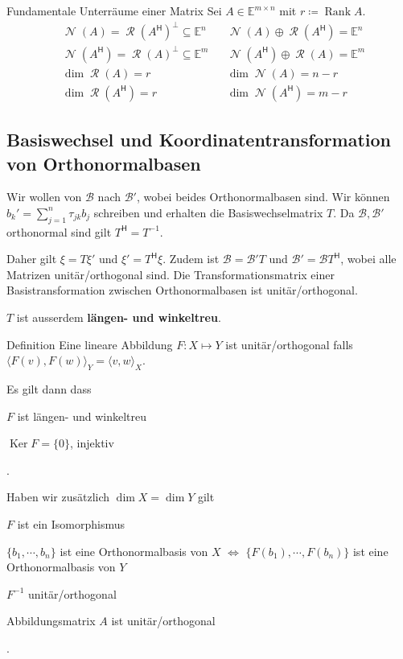 \documentclass[a4paper,10pt]{article}
\DeclareMathOperator{\Rank}{Rank}
\DeclareMathOperator{\Columnspace}{\mathcal{R}}
\DeclareMathOperator{\Nullspace}{\mathcal{N}}
\DeclareMathOperator{\Kernel}{Ker}
\newcommand*{\hermconj}{\mathsf{H}}
\def\E{\mathbb{E}}
\begin{document}
\begin{mainbox}{Fundamentale Unterräume einer Matrix}
  Sei $A \in \E^{m \times n}$ mit $r \coloneqq \Rank A$.
  \begin{align*}
    & \Nullspace(A) = \Columnspace(A^\hermconj)^\perp \subseteq \E^n & & \Nullspace(A) \oplus \Columnspace(A^\hermconj) = \E^n\\
    & \Nullspace(A^\hermconj) = \Columnspace(A)^\perp \subseteq \E^m & & \Nullspace(A^\hermconj) \oplus \Columnspace(A) = \E^m\\
    & \dim \Columnspace(A) = r & & \dim \Nullspace(A) = n - r\\
    & \dim \Columnspace(A^\hermconj) = r & & \dim \Nullspace(A^\hermconj) = m - r
  \end{align*}
\end{mainbox}

\subsection{Basiswechsel und Koordinatentransformation von Orthonormalbasen}

Wir wollen von $\mathcal{B}$ nach $\mathcal{B}'$, wobei beides Orthonormalbasen sind. Wir können $b_k' = \sum_{j=1}^n \tau_{jk} b_j$ schreiben und erhalten die Basiswechselmatrix $T$. Da $\mathcal{B}, \mathcal{B}'$ orthonormal sind gilt $T^\hermconj = T^{-1}$.

Daher gilt $\xi = T \xi'$ und $\xi' = T^\hermconj \xi$. Zudem ist $\mathcal{B} = \mathcal{B}' T$ und $\mathcal{B}' = \mathcal{B} T^\hermconj$, wobei alle Matrizen unitär/orthogonal sind. Die Transformationsmatrix einer Basistransformation zwischen Orthonormalbasen ist unitär/orthogonal.

$T$ ist ausserdem \textbf{längen- und winkeltreu}. 

\begin{mainbox}{Definition}
  Eine lineare Abbildung $F: X \mapsto Y$ ist unitär/orthogonal falls $\langle F(v), F(w) \rangle_Y = \langle v, w \rangle_X$.
\end{mainbox}

Es gilt dann dass \begin{rowlist}
  \item $F$ ist längen- und winkeltreu
  \item $\Kernel F = \{0\}$, injektiv
\end{rowlist}.

Haben wir zusätzlich $\dim X = \dim Y$ gilt \begin{rowlist}
  \item $F$ ist ein Isomorphismus
  \item $\{b_1, \cdots, b_n\}$ ist eine Orthonormalbasis von $X$ $\iff$ $\{F(b_1), \cdots, F(b_n)\}$ ist eine Orthonormalbasis von $Y$
  \item $F^{-1}$ unitär/orthogonal
  \item Abbildungsmatrix $A$ ist unitär/orthogonal
\end{rowlist}.
\end{document}
